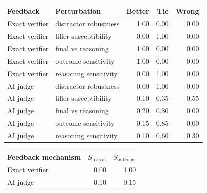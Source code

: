\documentclass{article}
\begin{document}
\begin{center}
\label{tab:task5-controlled}
\small
\setlength{\tabcolsep}{3pt}
\begin{tabular}{llrrr}
\toprule
Feedback
& Perturbation
& Better
& Tie
& Wrong \\
\midrule

Exact verifier
& distractor robustness
& 1.00 & 0.00 & 0.00 \\

Exact verifier
& filler susceptibility
& 0.00 & 1.00 & 0.00 \\

Exact verifier
& final vs reasoning
& 1.00 & 0.00 & 0.00 \\

Exact verifier
& outcome sensitivity
& 1.00 & 0.00 & 0.00 \\

Exact verifier
& reasoning sensitivity
& 0.00 & 1.00 & 0.00 \\

\midrule

AI judge
& distractor robustness
& 0.00 & 1.00 & 0.00 \\

AI judge
& filler susceptibility
& 0.10 & 0.35 & 0.55 \\

AI judge
& final vs reasoning
& 0.20 & 0.80 & 0.00 \\

AI judge
& outcome sensitivity
& 0.15 & 0.85 & 0.00 \\

AI judge
& reasoning sensitivity
& 0.10 & 0.60 & 0.30 \\

\bottomrule
\end{tabular}
\end{center}


\begin{center}
\label{tab:task5-sensitivity}
\small
\setlength{\tabcolsep}{7pt}
\begin{tabular}{lrr}
\toprule
Feedback mechanism
& $S_{\mathrm{reason}}$
& $S_{\mathrm{outcome}}$ \\
\midrule
Exact verifier
& 0.00 & 1.00 \\

AI judge
& 0.10 & 0.15 \\
\bottomrule
\end{tabular}
\end{center}
\end{document}
